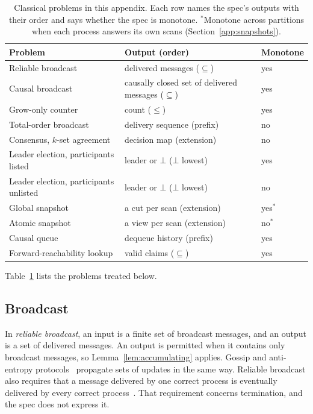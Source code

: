 \documentclass[sigconf]{cidr-2027}
\theoremstyle{remark}
\begin{document}
\begin{table}[t]
  \centering
  \footnotesize
  \setlength{\tabcolsep}{3pt}
  \begin{tabular}{@{}>{\raggedright\arraybackslash}p{}>{\raggedright\arraybackslash}p{}l@{}}
    \toprule
    Problem & Output (order) & Monotone \\
    \midrule
    Reliable broadcast & delivered messages ($\subseteq$) & yes \\
    Causal broadcast & causally closed set of delivered messages ($\subseteq$) & yes \\
    Grow-only counter & count ($\leq$) & yes \\
    Total-order broadcast & delivery sequence (prefix) & no \\
    Consensus, $k$-set agreement & decision map (extension) & no \\
    Leader election, participants listed & leader or $\bot$ ($\bot$ lowest) & yes \\
    Leader election, participants unlisted & leader or $\bot$ ($\bot$ lowest) & no \\
    Global snapshot & a cut per scan (extension) & yes$^*$ \\
    Atomic snapshot & a view per scan (extension) & no$^*$ \\
    Causal queue & dequeue history (prefix) & yes \\
    Forward-reachability lookup & valid claims ($\subseteq$) & yes \\
    \bottomrule
  \end{tabular}
  \caption{Classical problems in this appendix.  Each row names the spec's
  outputs with their order and says whether the spec is monotone.
  $^*$Monotone across partitions when each process answers its own scans
  (Section~\ref{app:snapshots}).}
  \label{tab:classical-problems}
\end{table}

Table~\ref{tab:classical-problems} lists the problems treated below.

\subsection{Broadcast}
\label{app:broadcast}

In \emph{reliable broadcast}, an input is a finite set of broadcast messages,
and an output is a set of delivered messages. An output is permitted when it
contains only broadcast messages, so Lemma~\ref{lem:accumulating} applies. Gossip and anti-entropy protocols~\cite{demers1987epidemic} propagate sets of
updates in the same way. Reliable broadcast also requires that a message
delivered by one correct process is eventually delivered by every correct
process~\cite{hadzilacos1994modular}. That requirement concerns termination,
and the spec does not express it.
\end{document}
